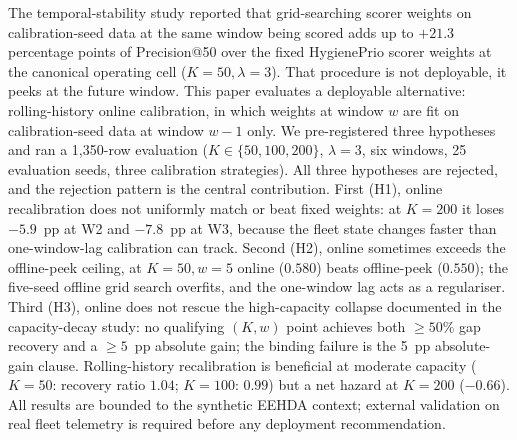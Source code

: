 The temporal-stability study reported that grid-searching scorer weights on calibration-seed
data at the same window being scored adds up to $+21.3$ percentage points
of Precision@50 over the fixed HygienePrio scorer weights at the canonical operating
cell ($K=50, \lambda=3$). That procedure is not deployable, it peeks
at the future window. This paper evaluates a deployable alternative:
rolling-history online calibration, in which weights at window $w$ are
fit on calibration-seed data at window $w-1$ only. We pre-registered
three hypotheses and ran a 1{,}350-row evaluation
($K \in \{50, 100, 200\}$, $\lambda = 3$, six windows, 25 evaluation
seeds, three calibration strategies). All three hypotheses are rejected,
and the rejection pattern is the central contribution. First (H1),
online recalibration does not uniformly match or beat fixed weights: at
$K = 200$ it loses $-5.9$~pp at W2 and $-7.8$~pp at W3, because the
fleet state changes faster than one-window-lag calibration can track.
Second (H2), online sometimes exceeds the offline-peek ceiling, at
$K = 50, w = 5$ online ($0.580$) beats offline-peek ($0.550$); the
five-seed offline grid search overfits, and the one-window lag acts as
a regulariser. Third (H3), online does not rescue the high-capacity
collapse documented in the capacity-decay study: no qualifying $(K, w)$ point achieves
both $\geq 50\%$ gap recovery and a $\geq 5$~pp absolute gain; the
binding failure is the 5~pp absolute-gain clause. Rolling-history
recalibration is beneficial at moderate capacity ($K = 50$: recovery
ratio $1.04$; $K = 100$: $0.99$) but a net hazard at $K = 200$
($-0.66$). All results are bounded to the synthetic EEHDA context;
external validation on real fleet telemetry is required before any
deployment recommendation.
